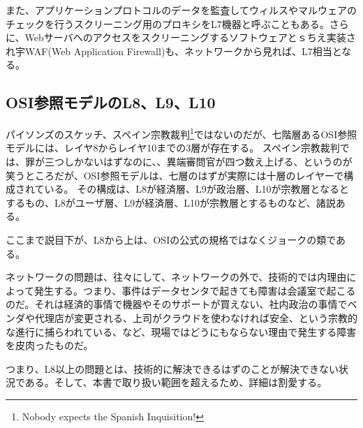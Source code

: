 また、アプリケーションプロトコルのデータを監査してウィルスやマルウェアのチェックを行うスクリーニング用のプロキシをL7機器と呼ぶこともある。さらに、Webサーバへのアクセスをスクリーニングするソフトウェアとｓちえ実装され宇WAF(Web Application Firewall)も、ネットワークから見れば、L7相当となる。

\subsection{OSI参照モデルのL8、L9、L10}

パイソンズのスケッチ、スペイン宗教裁判\footnote{Nobody expects the Spanish Inquisition!}ではないのだが、七階層あるOSI参照モデルには、レイヤ8からレイヤ10までの3層が存在する。
スペイン宗教裁判では、罪が三つしかないはずなのに、、異端審問官が四つ数え上げる、というのが笑うところだが、OSI参照モデルは、七層のはずが実際には十層のレイヤーで構成されている。
その構成は、L8が経済層、L9が政治層、L10が宗教層となるとするもの、L8がユーザ層、L9が経済層、L10が宗教層とするものなど、諸説ある。

ここまで説目下が、L8から上は、OSIの公式の規格ではなくジョークの類である。

ネットワークの問題は、往々にして、ネットワークの外で、技術的では内理由によって発生する。つまり、事件はデータセンタで起きても障害は会議室で起こるのだ。それは経済的事情で機器やそのサポートが買えない、社内政治の事情でベンダや代理店が変更される、上司がクラウドを使わなければ安全、という宗教的な進行に捕らわれている、など、現場ではどうにもならない理由で発生する障害を皮肉ったものだ。

つまり、L8以上の問題とは、技術的に解決できるはずのことが解決できない状況である。そして、本書で取り扱い範囲を超えるため、詳細は割愛する。


